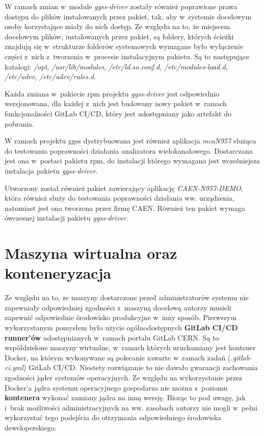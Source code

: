 W ramach zmian w~module \textit{ggss-driver} zostały również poprawione prawa dostępu do plików instalowanych przez pakiet, tak, aby w~systemie docelowym osoby korzystające miały do nich dostęp. 
Ze względu na to, że miejscem docelowym plików, instalowanych przez pakiet, są foldery, których ścieżki znajdują się w~strukturze folderów systemowych wymagane było wyłączenie części z~nich z~tworzenia w~procesie instalacyjnym pakietu. Są to następujące katalogi: \textit{/opt}, \textit{/usr/lib/modules}, \textit{/etc/ld.so.conf.d}, \textit{/etc/modules-load.d}, \textit{/etc/udev}, \textit{/etc/udev/rules.d}.

Każda zmiana w~pakiecie \gls*{rpm} projektu \textit{ggss-driver} jest odpowiednio wersjonowana, dla każdej z~nich jest budowany nowy pakiet w~ramach funkcjonalności GitLab CI/CD, który jest udostępniany jako artefakt do pobrania.

W ramach projektu \gls*{ggss} dystrybuowana jest również aplikacja \textit{mcaN957} służąca do testowania poprawności działania analizatora wielokanałowego. Dostarczana jest ona w~postaci pakietu \gls*{rpm}, do instalacji którego wymagana jest wcześniejsza instalacja pakietu \textit{ggss-driver}.

Utworzony został również pakiet zawierający aplikację \textit{CAEN-N957-DEMO}, która również służy do testowania poprawności działania ww. urządzenia, natomiast jest ona tworzona przez firmę CAEN. Również ten pakiet wymaga ówczesnej instalacji pakietu \textit{ggss-driver}.


\newpage
\section{Maszyna wirtualna oraz konteneryzacja}
\label{sec:wirtDocker}

Ze względu na to, że maszyny dostarczone przed administratorów systemu nie zapewniały odpowiedniej zgodności z~maszyną docelową autorzy musieli zapewnić odpowiednie środowisko produkcyjne w~inny sposób. Pierwszym wykorzystanym pomysłem było użycie ogólnodostępnych \textbf{GitLab CI/CD runner'ów} udostępnianych w~ramach portalu GitLab CERN. Są to współdzielone maszyny wirtualne, w~ramach których uruchamiany jest kontener Docker, na którym wykonywane są polecanie zawarte w~ramach zadań (\textit{.gitlab-ci.yml}) GitLab CI/CD. Niestety rozwiązanie to nie dawało gwarancji zachowania zgodności jąder systemów operacyjnych. Ze względu na wykorzystanie przez Docker'a jądra systemu operacyjnego gospodarza nie można z~poziomu \textbf{kontenera} wykonać zamiany jądra na inną wersję. Biorąc to pod uwagę, jak i~brak możliwości administracyjnych na ww. zasobach autorzy nie mogli w~pełni wykorzystać tego podejścia do otrzymania odpowiedniego środowiska deweloperskiego.

